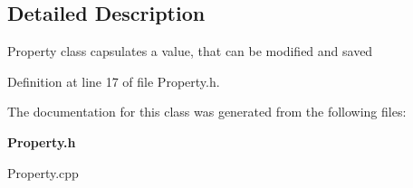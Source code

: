 \subsection{Detailed Description}
Property class capsulates a value, that can be modified and saved 

Definition at line 17 of file Property.\-h.



The documentation for this class was generated from the following files\-:\begin{DoxyCompactItemize}
\item 
{\bf Property.\-h}\item 
Property.\-cpp\end{DoxyCompactItemize}
